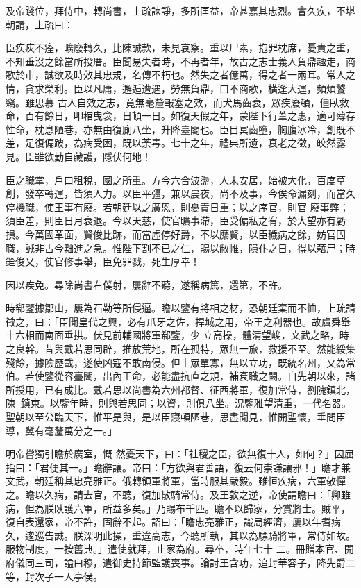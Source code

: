 \begin{pinyinscope}
 及帝踐位，拜侍中，轉尚書，上疏諫諍，多所匡益，帝甚嘉其忠烈。會久疾，不堪朝請，上疏曰：



 臣疾疢不痊，曠廢轉久，比陳誠款，未見哀察。重以尸素，抱罪枕席，憂責之重，不知垂沒之餘當所投厝。臣聞易失者時，不再者年，故古之志士義人負鼎趣走，商歌於市，誠欲及時效其忠規，名傳不朽也。然失之者億萬，得之者一兩耳。常人之情，貪求榮利。臣以凡庸，邂逅遭遇，勞無負鼎，口不商歌，橫逢大運，頻煩饕竊。雖思慕
 古人自效之志，竟無毫釐報塞之效，而犬馬齒衰，眾疾廢頓，僵臥救命，百有餘日，叩棺曳衾，日頓一日。如復天假之年，蒙陛下行葦之惠，適可薄存性命，枕息陋巷，亦無由復廁八坐，升降臺閣也。臣目冥齒墮，胸腹冰冷，創既不差，足復偏跛，為病受困，既以荼毒。七十之年，禮典所遺，衰老之徵，皎然露見。臣雖欲勤自藏護，隱伏何地！



 臣之職掌，戶口租稅，國之所重。方今六合波盪，人未安居，始被大化，百度草創，發卒轉運，皆須人力。以臣平彊，兼以晨夜，尚不及事，今俟命漏刻，而當久停機職，使王事有廢。若朝廷以之廣恩，則憂責日重；以之序官，則官
 廢事弊；須臣差，則臣日月衰退。今以天慈，使官曠事滯，臣受偏私之宥，於大望亦有虧損。今萬國革面，賢俊比跡，而當虛停好爵，不以縻賢，以臣穢病之餘，妨官固職，誠非古今黜進之急。惟陛下割不已之仁，賜以敝帷，隕仆之日，得以藉尸；時銓俊乂，使官修事舉，臣免罪戮，死生厚幸！



 因以疾免。尋除尚書右僕射，屢辭不聽，遂稱病篤，還第，不許。



 時郗鑒據鄒山，屢為石勒等所侵逼。瞻以鑒有將相之材，恐朝廷棄而不恤，上疏請徵之，曰：「臣聞皇代之興，必有爪牙之佐，捍城之用，帝王之利器也。故虞舜舉十六相而南面垂拱。伏見前輔國將軍郗鑒，少
 立高操，體清望峻，文武之略，時之良幹。昔與戴若思同辟，推放荒地，所在孤特，眾無一旅，救援不至。然能綏集殘餘，據險歷載，遂使凶寇不敢南侵。但士眾單寡，無以立功，既統名州，又為常伯。若使鑒從容臺闥，出內王命，必能盡抗直之規，補袞職之闕。自先朝以來，諸所授用，已有成比。戴若思以尚書為六州都督、征西將軍，復加常侍，劉隗鎮北，陳鎮東。以鑒年時，則與若思同；以資，則俱八坐。況鑒雅望清重，一代名器。聖朝以至公臨天下，惟平是與，是以臣寢頓陋巷，思盡聞見，惟開聖懷，垂問臣導，冀有毫釐萬分之一。」



 明帝嘗獨引瞻於廣室，慨
 然憂天下，曰：「社稷之臣，欲無復十人，如何？」因屈指曰：「君便其一。」瞻辭讓。帝曰：「方欲與君善語，復云何崇謙讓邪！」瞻才兼文武，朝廷稱其忠亮雅正。俄轉領軍將軍，當時服其嚴毅。雖恒疾病，六軍敬憚之。瞻以久病，請去官，不聽，復加散騎常侍。及王敦之逆，帝使謂瞻曰：「卿雖病，但為朕臥護六軍，所益多矣。」乃賜布千匹。瞻不以歸家，分賞將士。賊平，復自表還家，帝不許，固辭不起。詔曰：「瞻忠亮雅正，識局經濟，屢以年耆病久，逡巡告誠。朕深明此操，重違高志，今聽所執，其以為驃騎將軍，常侍如故。服物制度，一按舊典。」遣使就拜，止家為府。尋卒，時年七十
 二。冊贈本官、開府儀同三司，謚曰穆，遣御史持節監護喪事。論討王含功，追封華容子，降先爵二等，封次子一人亭侯。




\end{pinyinscope}
